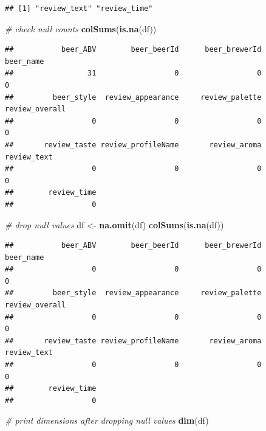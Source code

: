 \documentclass[
  a4paper,
]{article}
\newenvironment{Shaded}{\begin{snugshade}}{\end{snugshade}}
\newcommand{\CommentTok}[1]{\textcolor[rgb]{0.56,0.35,0.01}{\textit{#1}}}
\newcommand{\FunctionTok}[1]{\textcolor[rgb]{0.13,0.29,0.53}{\textbf{#1}}}
\newcommand{\NormalTok}[1]{#1}
\newcommand{\OtherTok}[1]{\textcolor[rgb]{0.56,0.35,0.01}{#1}}
\begin{document}
\begin{verbatim}
## [1] "review_text" "review_time"
\end{verbatim}

\begin{Shaded}
\begin{Highlighting}[]
\CommentTok{\# check null counts}
\FunctionTok{colSums}\NormalTok{(}\FunctionTok{is.na}\NormalTok{(df))}
\end{Highlighting}
\end{Shaded}

\begin{verbatim}
##           beer_ABV        beer_beerId      beer_brewerId          beer_name 
##                 31                  0                  0                  0 
##         beer_style  review_appearance     review_palette     review_overall 
##                  0                  0                  0                  0 
##       review_taste review_profileName       review_aroma        review_text 
##                  0                  0                  0                  0 
##        review_time 
##                  0
\end{verbatim}

\begin{Shaded}
\begin{Highlighting}[]
\CommentTok{\# drop null values}
\NormalTok{df }\OtherTok{\textless{}{-}} \FunctionTok{na.omit}\NormalTok{(df)}
\FunctionTok{colSums}\NormalTok{(}\FunctionTok{is.na}\NormalTok{(df))}
\end{Highlighting}
\end{Shaded}

\begin{verbatim}
##           beer_ABV        beer_beerId      beer_brewerId          beer_name 
##                  0                  0                  0                  0 
##         beer_style  review_appearance     review_palette     review_overall 
##                  0                  0                  0                  0 
##       review_taste review_profileName       review_aroma        review_text 
##                  0                  0                  0                  0 
##        review_time 
##                  0
\end{verbatim}

\begin{Shaded}
\begin{Highlighting}[]
\CommentTok{\# print dimensions after dropping null values}
\FunctionTok{dim}\NormalTok{(df)}
\end{Highlighting}
\end{Shaded}
\end{document}
